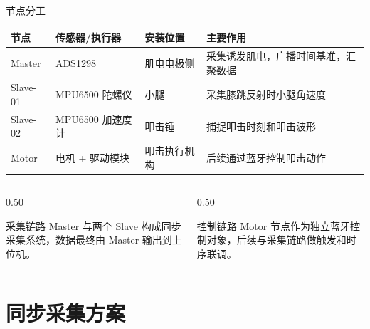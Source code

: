 \documentclass[aspectratio=169,fontset=none]{ctexbeamer}
\begin{document}
\begin{frame}{节点分工}
  \vspace{0.08cm}
  \begin{table}
    \centering
    \scriptsize
    \begin{tabular}{p{}p{}p{}p{}}
      \toprule
      节点 & 传感器/执行器 & 安装位置 & 主要作用 \\
      \midrule
      Master & ADS1298 & 肌电电极侧 & 采集诱发肌电，广播时间基准，汇聚数据 \\
      Slave-01 & MPU6500 陀螺仪 & 小腿 & 采集膝跳反射时小腿角速度 \\
      Slave-02 & MPU6500 加速度计 & 叩击锤 & 捕捉叩击时刻和叩击波形 \\
      Motor & 电机 + 驱动模块 & 叩击执行机构 & 后续通过蓝牙控制叩击动作 \\
      \bottomrule
    \end{tabular}
  \end{table}

  \vspace{0.22cm}
  \begin{columns}
    \begin{column}{0.50\textwidth}
      \begin{block}{采集链路}
        Master 与两个 Slave 构成同步采集系统，数据最终由 Master 输出到上位机。
      \end{block}
    \end{column}
    \begin{column}{0.50\textwidth}
      \begin{block}{控制链路}
        Motor 节点作为独立蓝牙控制对象，后续与采集链路做触发和时序联调。
      \end{block}
    \end{column}
  \end{columns}
\end{frame}

\section{同步采集方案}
\end{document}
